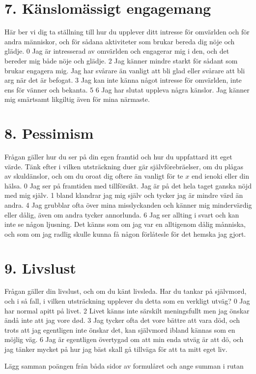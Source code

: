 \section*{7. Känslomässigt engagemang}
Här ber vi dig ta ställning till hur du upplever ditt intresse för omvärlden och för andra människor, och för sådana aktiviteter som brukar bereda dig nöje och glädje.
0 Jag är intresserad av omvärlden och engagerar mig i den, och det bereder mig både nöje och glädje.
2 Jag känner mindre starkt för sådant som brukar engagera mig. Jag har svårare än vanligt att bli glad eller svårare att bli arg när det är befogat.
3 Jag kan inte känna något intresse för omvärlden, inte ens för vänner och bekanta.
5
6 Jag har slutat uppleva några känslor. Jag känner mig smärtsamt likgiltig även för mina närmaste.
\section*{8. Pessimism}
Frågan gäller hur du ser på din egen framtid och hur du uppfattard itt eget värde. Tänk efter i vilken utsträckning duer gär självförebräelser, om du plågas av skuldänslor, och om du oroat dig oftere än vanligt för te \(x\) end ienoki eller din hälsa.
0 Jag ser på framtiden med tillförsikt. Jag är på det hela taget ganska nöjd med mig själv.
1 bland klandrar jag mig själv och tycker jag är mindre värd än andra.
4 Jag grubblar ofta över mina misslyckanden och känner mig mindervärdig eller dålig, även om andra tycker annorlunda.
6 Jag ser allting i svart och kan inte se någon ljusning. Det känns som om jag var en alltigenom dålig månniska, och som om jag radlig skulle kunna få någon förlåtesle för det hemska jag gjort.
\section*{9. Livslust}
Frågan gäller din livslust, och om du känt livsleda. Har du tankar på självmord, och i så fall, i vilken utsträckning upplever du detta som en verkligt utväg?
0 Jag har normal apitt på livet.
2 Livet känns inte särskilt meningsfullt men jag önskar ändå inte att jag vore død.
3 Jag tycker ofta det vore bättre att vara död, och trots att jag egentligen inte önskar det, kan självmord ibland kännas som en möjlig väg.
6 Jag är egentligen övertygad om att min enda utväg är att dö, och jag tänker mycket på hur jag bäst skall gå tillväga för att ta mitt eget liv.

Lägg samman poängen från båda sidor av formulåret och ange summan i rutan